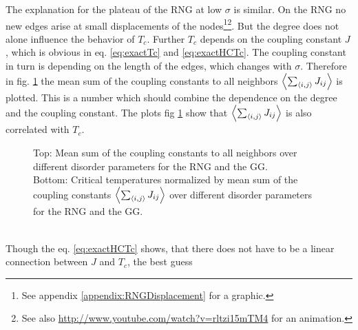     The explanation for the plateau of the RNG at low \(\sigma\) is similar.
    On the RNG no new edges arise at small displacements of the nodes\footnote{See appendix \ref{appendix:RNGDisplacement} for a graphic.}\footnote{See also \url{http://www.youtube.com/watch?v=rltzi15mTM4} for an animation.}.
    But the degree does not alone influence the behavior of \(T_c\).
    Further \(T_c\) depends on the coupling constant \(J\), which is
    obvious in eq. \eqref{eq:exactTc} and \eqref{eq:exactHCTc}. The
    coupling constant in turn is depending on the length of the edges,
    which changes with \(\sigma\).
    Therefore  in fig. \ref{fig:TcJ}
    the mean sum of the coupling constants to all neighbors \(\left< \sum_{\left< i,j \right>} J_{ij} \right>\)
    is plotted. This is a number which should combine the dependence on
    the degree and the coupling constant.
    The plots fig \ref{fig:TcJ}
    show that \(\left< \sum_{\left< i,j \right>} J_{ij} \right>\) is also correlated with \(T_c\).
    \begin{figure}[htbp]
        \centering


        \caption[Critical Temperature Normalized by Mean Sum of the Coupling Constants]
        {
            Top: Mean sum of the coupling constants to all
            neighbors over different disorder parameters for
             the RNG and
             the GG.\\
            Bottom: Critical temperatures normalized by mean sum of the
            coupling constants \(\left< \sum_{\left< i,j \right>} J_{ij} \right>\) over different
            disorder parameters for
             the RNG and
             the GG.
        }
        \label{fig:TcJ}
    \end{figure}\\
    Though the eq. \eqref{eq:exactHCTc} shows, that there does not have
    to be a linear connection between \(J\) and \(T_c\), the best guess
